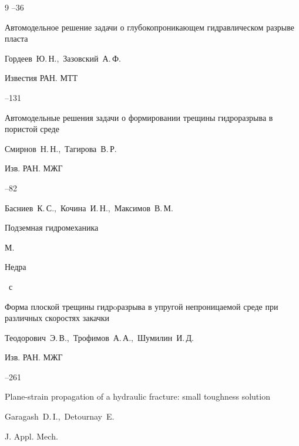 \begin{thebibliography}{9}
--36




\paper Автомодельное решение задачи о глубокопроникающем гидравлическом разрыве пласта

\by   Гордеев~Ю.\,Н.,~Зазовский~А.\,Ф.

\jour Известия РАН. МТТ



--131




\paper Автомодельные решения задачи о формировании трещины гидроразрыва в пористой среде

\by   Смирнов~Н.\,Н.,~Тагирова~В.\,Р.

\jour Изв. РАН. МЖГ



--82






\by Басниев~К.\,С.,~Кочина~И.\,Н.,~Максимов~В.\,М.

\book Подземная гидромеханика

\publaddr М.

\publ Недра


~с




\paper Форма плоской трещины гидрoразрыва в упругой непроницаемой среде при различных скоростях закачки

\by   Теодорович~Э.\,В.,~Трофимов~А.\,А.,~Шумилин~И.\,Д.

\jour Изв. РАН. МЖГ



--261




\paper Plane-strain propagation of a hydraulic fracture: small toughness solution

\by   Garagash~D.\,I.,~Detournay~E.

\jour J. Appl. Mech.



\end{thebibliography}
